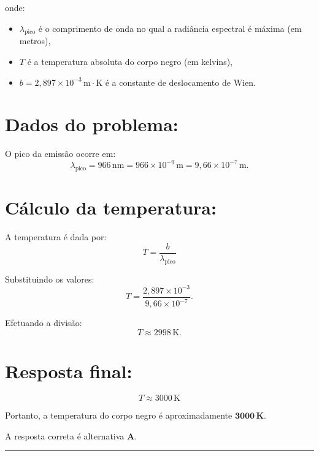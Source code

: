 \documentclass[a4paper,12pt]{article}
\begin{document}
\begin{flushleft}
onde:
\begin{itemize}
    \item \( \lambda_{\text{pico}} \) é o comprimento de onda no qual a radiância espectral é máxima (em metros),
    \item \( T \) é a temperatura absoluta do corpo negro (em kelvins),
    \item \( b = 2,897 \times 10^{-3} \, \mathrm{m\cdot K} \) é a constante de deslocamento de Wien.
\end{itemize}

\section*{Dados do problema:}

O pico da emissão ocorre em:
\[
\lambda_{\text{pico}} = 966 \, \mathrm{nm} = 966 \times 10^{-9} \, \mathrm{m} = 9,66 \times 10^{-7} \, \mathrm{m}.
\]

\section*{Cálculo da temperatura:}

A temperatura é dada por:
\[
T = \frac{b}{\lambda_{\text{pico}}}
\]

Substituindo os valores:
\[
T = \frac{2,897 \times 10^{-3}}{9,66 \times 10^{-7}}.
\]

Efetuando a divisão:
\[
T \approx 2998 \, \mathrm{K}.
\]

\section*{Resposta final:}

\[
\boxed{
T \approx 3000 \, \mathrm{K}
}
\]

Portanto, a temperatura do corpo negro é aproximadamente \( \mathbf{3000\,K} \).

A resposta correta é alternativa \colorbox{green!50}{\textbf{A}}.
\end{flushleft}

\noindent\rule{\linewidth}{0.6pt}\\
\end{document}
